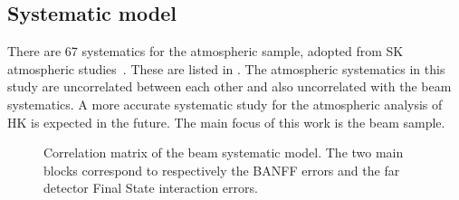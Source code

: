 \subsection{Systematic model}
\label{sec:syst_model}

There are 67 systematics for the atmospheric sample, adopted from SK atmospheric studies~\cite{Abe:2017aap}.
These are listed in .
The atmospheric systematics in this study are uncorrelated between each other and also uncorrelated with the beam systematics.
A more accurate systematic study for the atmospheric analysis of HK is expected in the future.
The main focus of this work is the beam sample.

\begin{figure}[t]
	\centering
	\resizebox{0.8\linewidth}{!}{}
	\caption[Correlation matrix of the beam systematic model]%
		{Correlation matrix of the beam systematic model.
		The two main blocks correspond to respectively the BANFF errors and the far detector %
		Final State interaction errors.}
	\label{fig:correlation}
\end{figure}

